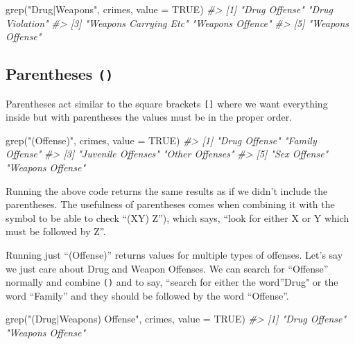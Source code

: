 \documentclass[
]{krantz}
\makeatletter
\newenvironment{Shaded}{\begin{snugshade}}{\end{snugshade}}
\newcommand{\AttributeTok}[1]{\textcolor[rgb]{0.61,0.61,0.61}{#1}}
\newcommand{\CommentTok}[1]{\textcolor[rgb]{0.37,0.37,0.37}{\textit{#1}}}
\newcommand{\ConstantTok}[1]{\textcolor[rgb]{0,0,0}{#1}}
\newcommand{\FunctionTok}[1]{\textcolor[rgb]{0,0,0}{#1}}
\newcommand{\NormalTok}[1]{#1}
\newcommand{\StringTok}[1]{\textcolor[rgb]{0.5,0.5,0.5}{#1}}
\newenvironment{kframe}{%
\medskip{}
\setlength{\fboxsep}{.8em}
 \def\at@end@of@kframe{}%
 \ifinner\ifhmode%
  \def\at@end@of@kframe{\end{minipage}}%
  \begin{minipage}{\columnwidth}%
 \fi\fi%
 \def\FrameCommand##1{\hskip\@totalleftmargin \hskip-\fboxsep
 \colorbox{shadecolor}{##1}\hskip-\fboxsep
     \hskip-\linewidth \hskip-\@totalleftmargin \hskip\columnwidth}%
 \MakeFramed {\advance\hsize-\width
   \@totalleftmargin\z@ \linewidth\hsize
   \@setminipage}}%
 {\par\unskip\endMakeFramed%
 \at@end@of@kframe}
\renewenvironment{Shaded}{\begin{kframe}}{\end{kframe}}
\makeatother
\begin{document}
\begin{Shaded}
\begin{Highlighting}[]
\FunctionTok{grep}\NormalTok{(}\StringTok{"Drug|Weapons"}\NormalTok{, crimes, }\AttributeTok{value =} \ConstantTok{TRUE}\NormalTok{)}
\CommentTok{\#\textgreater{} [1] "Drug Offense"         "Drug Violation"      }
\CommentTok{\#\textgreater{} [3] "Weapons Carrying Etc" "Weapons Offence"     }
\CommentTok{\#\textgreater{} [5] "Weapons Offense"}
\end{Highlighting}
\end{Shaded}

\hypertarget{parentheses}{%
\subsection{\texorpdfstring{Parentheses \texttt{()}}{Parentheses ()}}\label{parentheses}}

Parentheses act similar to the square brackets \texttt{{[}{]}} where we want everything inside but with parentheses the values must be in the proper order.

\begin{Shaded}
\begin{Highlighting}[]
\FunctionTok{grep}\NormalTok{(}\StringTok{"(Offense)"}\NormalTok{, crimes, }\AttributeTok{value =} \ConstantTok{TRUE}\NormalTok{)}
\CommentTok{\#\textgreater{} [1] "Drug Offense"      "Family Offense"   }
\CommentTok{\#\textgreater{} [3] "Juvenile Offenses" "Other Offenses"   }
\CommentTok{\#\textgreater{} [5] "Sex Offense"       "Weapons Offense"}
\end{Highlighting}
\end{Shaded}

Running the above code returns the same results as if we didn't include the parentheses. The usefulness of parentheses comes when combining it with the \texttt{\textbar{}} symbol to be able to check ``(X\textbar Y) Z''), which says, ``look for either X or Y which must be followed by Z''.

Running just ``(Offense)'' returns values for multiple types of offenses. Let's say we just care about Drug and Weapon Offenses. We can search for ``Offense'' normally and combine \texttt{()} and \texttt{\textbar{}} to say, ``search for either the word''Drug" or the word ``Family'' and they should be followed by the word ``Offense''.

\begin{Shaded}
\begin{Highlighting}[]
\FunctionTok{grep}\NormalTok{(}\StringTok{"(Drug|Weapons) Offense"}\NormalTok{, crimes, }\AttributeTok{value =} \ConstantTok{TRUE}\NormalTok{)}
\CommentTok{\#\textgreater{} [1] "Drug Offense"    "Weapons Offense"}
\end{Highlighting}
\end{Shaded}
\end{document}
